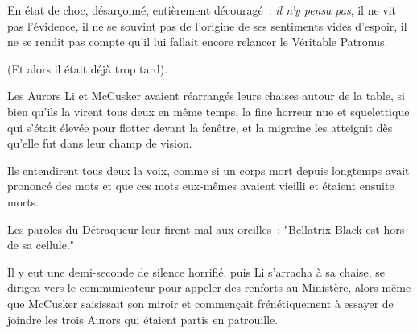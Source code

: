 En état de choc, désarçonné, entièrement découragé~: \emph{il n'y pensa pas}, il ne vit pas l'évidence, il ne se souvint pas de l'origine de ses sentiments vides d'espoir, il ne se rendit pas compte qu'il lui fallait encore relancer le Véritable Patronus.

(Et alors il était déjà trop tard).

\later

Les Aurors Li et McCusker avaient réarrangés leurs chaises autour de la table, si bien qu'ils la virent tous deux en même temps, la fine horreur nue et squelettique qui s'était élevée pour flotter devant la fenêtre, et la migraine les atteignit dès qu'elle fut dans leur champ de vision.

Ils entendirent tous deux la voix, comme si un corps mort depuis longtemps avait prononcé des mots et que ces mots eux-mêmes avaient vieilli et étaient ensuite morts.

Les paroles du Détraqueur leur firent mal aux oreilles~: "Bellatrix Black est hors de sa cellule."

Il y eut une demi-seconde de silence horrifié, puis Li s'arracha à sa chaise, se dirigea vers le communicateur pour appeler des renforts au Ministère, alors même que McCusker saisissait son miroir et commençait frénétiquement à essayer de joindre les trois Aurors qui étaient partis en patrouille. 

